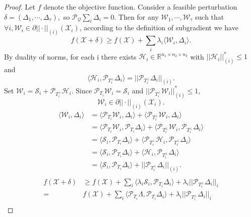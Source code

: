 \documentclass[journal,transmag]{IEEEtran}
\theoremstyle{plain}
\begin{document}
\begin{proof}
Let $f$ denote the objective function. Consider a feasible perturbation $\delta = (\Delta_1,\cdots,\Delta_{\tau}),$ so $\mathcal{P}_{\mathcal{Q}}\sum_i \Delta_i=0.$ Then for any $\mathcal{W}_1,\cdots,\mathcal{W}_{\tau}$ such that $\forall i, \mathcal{W}_i \in \partial||\cdot||_{(i)}(\mathcal{X}_i)$, according to the definition of subgradient we have
\begin{equation}
{f(\mathcal{X}+\delta)\ge f(\mathcal{X})+\sum_i \lambda_i\langle\mathcal{W}_i,\Delta_i\rangle.}
\end{equation}
By duality of norms, for each i there exists $\mathcal{H}_i \in \mathbb{R}^{n_1\times n_2 \times n_3}$ with $||\mathcal{H}_i||_{(i)}^*\le 1$ and \[\langle\mathcal{H}_i, \mathcal{P}_{T_i^{\bot}}\Delta_i\rangle=||\mathcal{P}_{T_i^{\bot}}\Delta_i||_{(i)}.\]
Set $\mathcal{W}_i = \mathcal{S}_i+\mathcal{P}_{T_i^{\bot}}\mathcal{H}_i.$ Since $\mathcal{P}_{T_i}\mathcal{W}_i=\mathcal{S}_i$ and $||\mathcal{P}_{T_i^{\bot}}\mathcal{W}_i||^*_{(i)}\le 1$, \[\mathcal{W}_i\in \partial||\cdot||_{(i)} (\mathcal{X}_i).\]
\begin{equation}
\begin{split}
\langle\mathcal{W}_i,\Delta_i\rangle &= \langle\mathcal{P}_{T_i}\mathcal{W}_i, \Delta_i\rangle + \langle\mathcal{P}_{T_i^{\bot}}\mathcal{W}_i, \Delta_i\rangle \\
& = \langle\mathcal{P}_{T_i}\mathcal{W}_i, \mathcal{P}_{T_i}\Delta_i\rangle + \langle\mathcal{P}_{T_i^{\bot}}\mathcal{W}_i, \mathcal{P}_{T_i^{\bot}}\Delta_i\rangle \\
& = \langle\mathcal{S}_i, \mathcal{P}_{T_i}\Delta_i\rangle + \langle\mathcal{P}_{T_i^{\bot}}\mathcal{H}_i, \mathcal{P}_{T_i^{\bot}}\Delta_i\rangle \\
& = \langle\mathcal{S}_i, \mathcal{P}_{T_i}\Delta_i\rangle + \langle\mathcal{H}_i, \mathcal{P}_{T_i^{\bot}}\Delta_i\rangle \\
& = \langle\mathcal{S}_i, \mathcal{P}_{T_i}\Delta_i\rangle + ||\mathcal{P}_{T_i^{\bot}} \Delta_i||_{(i)}.\\
\end{split}
\end{equation}
\begin{equation}
\begin{split}
f(\mathcal{X}+\delta)&\ge f(\mathcal{X}) + \sum_i \langle\lambda_i \mathcal{S}_i, \mathcal{P}_{T_i}\Delta_i\rangle + \lambda_i ||\mathcal{P}_{T_i^{\bot}}\Delta_i||_{i} \\
 = &f(\mathcal{X}) + \sum_i \langle\mathcal{P}_{T_i}\Lambda, \mathcal{P}_{T_i}\Delta_i\rangle + \lambda_i ||\mathcal{P}_{T_i^{\bot}}\Delta_i||_{i} \\

\end{split}
\end{equation}
\end{proof}
\end{document}
